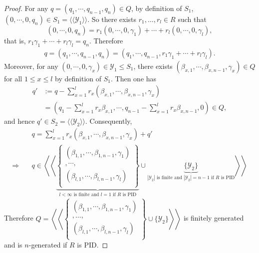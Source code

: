 \documentclass[12pt]{amsbook}
\begin{document}
\begin{proof}
    \medskip
    For any $q=(q_1,\cdots,q_{n-1},q_n)\in Q$, by definition of $S_1$, $(0,\cdots,0,q_n)\in S_1 = \langle \langle \mathcal{Y}_1 \rangle \rangle$. So there exists $r_1, \dots, r_l \in R$ such that$$(0,\cdots,0,q_n)=r_1(0,\cdots,0,\gamma_1)+\cdots+r_l(0,\cdots,0,\gamma_l),$$
    that is, $r_1 \gamma_1 + \cdots + r_l \gamma_l = q_n$. 
    Therefore
    \begin{align*}
        q =(q_1,\cdots,q_{n-1},q_n) =(q_1,\cdots,q_{n-1},r_1 \gamma_1 + \cdots + r_l \gamma_l).
    \end{align*}
    Moreover, for any $(0,\cdots,0,\gamma_x)\in\mathcal{Y}_1\leq S_1$, there exists $(\beta_{x,1},\cdots,\beta_{x,n-1},\gamma_x)\in Q$ for all $1\leq x\leq l$ by definition of $S_1$. Then one has
    \begin{align*}
        q'&:=q-\sum_{x=1}^{l}r_x(\beta_{x,1},\cdots,\beta_{x,n-1},\gamma_x)\\
        &=(q_1-\sum_{x=1}^{l}r_x\beta_{x,1},\cdots,q_{n-1}-\sum_{x=1}^{l}r_x\beta_{x,n-1},0)\in Q,
    \end{align*}
    and hence $q'\in S_2=\langle\langle\mathcal{Y}_2\rangle\rangle$. Consequently,
    \begin{align*}
        &\quad q=\sum_{x=1}^{l}r_x(\beta_{x,1},\cdots,\beta_{x,n-1},\gamma_x)+q'\\
        \Rightarrow &\quad q\in\left\langle\left\langle\underbrace{\left\{ 
        \begin{matrix}
            (\beta_{1,1},\cdots,\beta_{1,n-1},\gamma_1)\\
            ,\cdots,\\
            (\beta_{l,1},\cdots,\beta_{l,n-1},\gamma_l)\\
        \end{matrix}
    \right\}}_{l<\infty\text{ is finite and }l=1\text{ if $R$ is PID}}
    \cup\underbrace{\{\mathcal{Y}_2\}}_{|\mathcal{Y}_2|\text{ is finite and }|\mathcal{Y}_2|=n-1\text{ if $R$ is PID}}\right\rangle\right\rangle
    \end{align*}
    \medskip
    Therefore $Q=\left\langle\left\langle \left\{ 
    \begin{matrix}
        (\beta_{1,1},\cdots,\beta_{1,n-1},\gamma_1)\\
        ,\dots,\\
        (\beta_{l,1},\cdots,\beta_{l,n-1},\gamma_l)\\
    \end{matrix}
    \right\}\cup\{\mathcal{Y}_2\} \right\rangle\right\rangle$ is finitely generated and is $n$-generated if $R$ is PID.
\end{proof}
\end{document}
